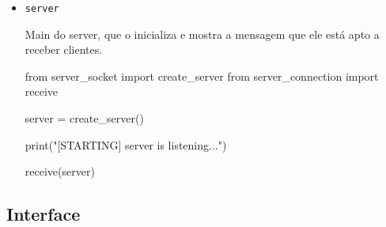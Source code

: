 \begin{itemize}
\begin{pycode}
			server.bind(ADDR)
			
			server.listen()
			
			return server
			
		\end{pycode}
		
		\item \texttt{server}
		
		Main do server, que o inicializa e mostra a mensagem que ele está apto a receber clientes.
		
		\begin{pycode}
			from server_socket import create_server
			from server_connection import receive
			
			server = create_server()
			
			print("[STARTING] server is listening...")
			
			receive(server)
			
		\end{pycode}
	\end{itemize}
	
	
	\subsection*{Interface}
	
